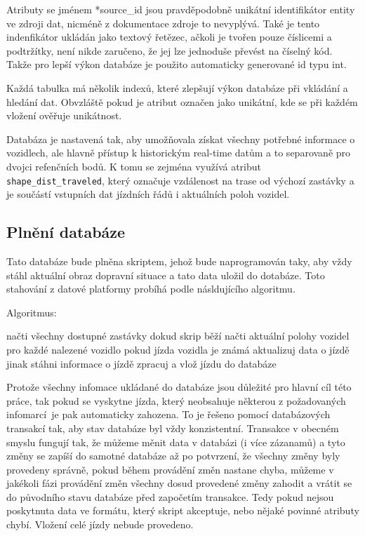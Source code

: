 Atributy se jménem *source\_id jsou pravděpodobně unikátní identifikátor entity ve zdroji dat, nicméně z dokumentace zdroje to nevyplývá. Také je tento indenfikátor ukládán jako textový řetězec, ačkoli je tvořen pouze číslicemi a podtržítky, není nikde zaručeno, že jej lze jednoduše převést na číselný kód. Takže pro lepší výkon databáze je použito automaticky generované id typu \gls{int}.

\bigbreak

Každá tabulka má několik indexů, které zlepšují výkon databáze při vkládání a hledání dat. Obvzláště pokud je atribut označen jako unikátní, kde se při každém vložení ověřuje unikátnost.

\bigbreak

Databáza je nastavená tak, aby umožňovala získat všechny potřebné informace o vozidlech, ale hlavně přístup k historickým real-time datům a to separovaně pro dvojci refenčních bodů. K tomu se zejména využívá atribut \verb-shape_dist_traveled-, který označuje vzdálenost na trase od výchozí zastávky a je součástí vstupních dat jízdních řádů i aktuálních poloh vozidel.

\subsection{Plnění databáze}

Tato databáze bude plněna skriptem, jehož bude naprogramován taky, aby vždy stáhl aktuální obraz dopravní situace a tato data uložil do dotabáze. Toto stahování z datové platformy probíhá podle násldujícího algoritmu.

\bigbreak

Algoritmus:
\begin{code}[frame=none]
načti všechny dostupné zastávky
dokud skrip běží
  načti aktuální polohy vozidel
  pro každé nalezené vozidlo
  pokud jízda vozidla je známá
    aktualizuj data o jízdě
  jinak
    stáhni informace o jízdě
    zpracuj a vlož jízdu do databáze
\end{code}

\bigbreak

Protože všechny infomace ukládané do databáze jsou důležité pro hlavní cíl této práce, tak pokud se vyskytne jízda, který neobsahuje některou z požadovaných infomarcí je pak automaticky zahozena. To je řešeno pomocí databázových transakcí tak, aby stav databáze byl vždy konzistentní. Transakce v obecném smyslu fungují tak, že můžeme měnit data v databázi (i více zázanamů) a tyto změny se zapíší do samotné databáze až po potvrzení, že všechny změny byly provedeny správně, pokud během provádění změn nastane chyba, můžeme v jakékoli fázi provádění změn všechny dosud provedené změny zahodit a vrátit se do původního stavu databáze před započetím transakce.  Tedy pokud nejsou poskytnuta data ve formátu, který skript akceptuje, nebo nějaké povinné atributy chybí. Vložení celé jízdy nebude provedeno.

